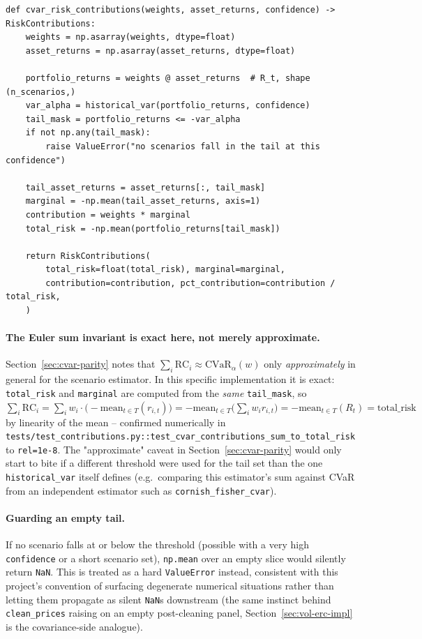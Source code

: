 \documentclass[11pt]{article}
\newcommand{\CVar}{\mathrm{CVaR}}
\begin{document}
\begin{lstlisting}
def cvar_risk_contributions(weights, asset_returns, confidence) -> RiskContributions:
    weights = np.asarray(weights, dtype=float)
    asset_returns = np.asarray(asset_returns, dtype=float)

    portfolio_returns = weights @ asset_returns  # R_t, shape (n_scenarios,)
    var_alpha = historical_var(portfolio_returns, confidence)
    tail_mask = portfolio_returns <= -var_alpha
    if not np.any(tail_mask):
        raise ValueError("no scenarios fall in the tail at this confidence")

    tail_asset_returns = asset_returns[:, tail_mask]
    marginal = -np.mean(tail_asset_returns, axis=1)
    contribution = weights * marginal
    total_risk = -np.mean(portfolio_returns[tail_mask])

    return RiskContributions(
        total_risk=float(total_risk), marginal=marginal,
        contribution=contribution, pct_contribution=contribution / total_risk,
    )
\end{lstlisting}

\paragraph{The Euler sum invariant is exact here, not merely
approximate.} Section~\ref{sec:cvar-parity} notes that
$\sum_i \text{RC}_i \approx \CVar_\alpha(w)$ only \emph{approximately}
in general for the scenario estimator. In this specific implementation
it is exact: \texttt{total\_risk} and \texttt{marginal} are computed
from the \emph{same} \texttt{tail\_mask}, so
$\sum_i \text{RC}_i = \sum_i w_i \cdot \big(-\text{mean}_{t \in T}(r_{i,t})\big)
= -\text{mean}_{t \in T}\big(\sum_i w_i r_{i,t}\big)
= -\text{mean}_{t \in T}(R_t) = \text{total\_risk}$
by linearity of the mean -- confirmed numerically in
\texttt{tests/test\_contributions.py::test\_cvar\_contributions\_sum\_to\_total\_risk}
to \texttt{rel=1e-8}. The "approximate" caveat in
Section~\ref{sec:cvar-parity} would only start to bite if a different
threshold were used for the tail set than the one \texttt{historical\_var}
itself defines (e.g.\ comparing this estimator's sum against CVaR from
an independent estimator such as \texttt{cornish\_fisher\_cvar}).

\paragraph{Guarding an empty tail.} If no scenario falls at or below the
threshold (possible with a very high \texttt{confidence} or a short
scenario set), \texttt{np.mean} over an empty slice would silently
return \texttt{NaN}. This is treated as a hard \texttt{ValueError}
instead, consistent with this project's convention of surfacing
degenerate numerical situations rather than letting them propagate as
silent \texttt{NaN}s downstream (the same instinct behind
\texttt{clean\_prices} raising on an empty post-cleaning panel,
Section~\ref{sec:vol-erc-impl} is the covariance-side analogue).
\end{document}
